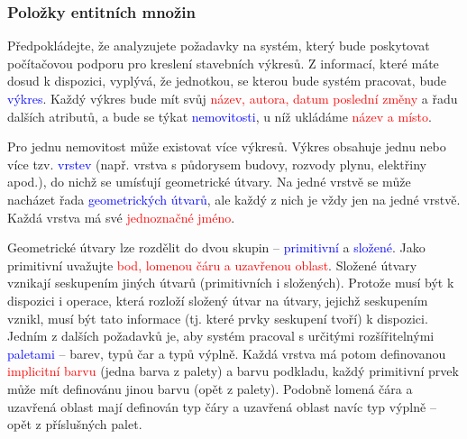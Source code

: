 \documentclass{beamer}
\begin{document}
  \begin{frame}
    \frametitle{Položky entitních množin}
    \scriptsize{
    \hspace{0.5cm}Předpokládejte, že analyzujete požadavky na systém, který bude poskytovat počítačovou
    podporu pro kreslení stavebních výkresů. Z informací, které máte dosud k dispozici,
    vyplývá, že jednotkou, se kterou bude systém pracovat, bude \textcolor{blue}{výkres}. Každý výkres bude
    mít svůj \textcolor{red}{název, autora, datum poslední změny} a řadu dalších atributů, a bude se týkat
    \textcolor{blue}{nemovitosti}, u níž ukládáme \textcolor{red}{název a místo}.\par


    \hspace{0.5cm}Pro jednu nemovitost může existovat více výkresů. Výkres obsahuje jednu nebo více tzv.
    \textcolor{blue}{vrstev} (např. vrstva s půdorysem budovy, rozvody plynu, elektřiny apod.), do nichž se
    umísťují geometrické útvary. Na jedné vrstvě se může nacházet řada \textcolor{blue}{geometrických útvarů},
    ale každý z nich je vždy jen na jedné vrstvě. Každá vrstva má své \textcolor{red}{jednoznačné jméno}.\par


    \hspace{0.5cm}Geometrické útvary lze rozdělit do dvou skupin -- \textcolor{blue}{primitivní} a \textcolor{blue}{složené}. Jako primitivní
    uvažujte \textcolor{red}{bod, lomenou čáru a uzavřenou oblast}. Složené útvary vznikají seskupením jiných
    útvarů (primitivních i složených). Protože musí být k dispozici i operace, která rozloží
    složený útvar na útvary, jejichž seskupením vznikl, musí být tato informace (tj. které
    prvky seskupení tvoří) k dispozici. Jedním z dalších požadavků je, aby systém pracoval
    s určitými rozšířitelnými \textcolor{blue}{paletami} -- barev, typů čar a typů výplně. Každá vrstva má
    potom definovanou \textcolor{red}{implicitní barvu} (jedna barva  z  palety) a barvu podkladu, každý
    primitivní prvek může mít definovánu jinou barvu (opět z palety). Podobně lomená čára
    a uzavřená oblast mají definován typ čáry a uzavřená oblast navíc typ výplně – opět
    z příslušných palet.\par}
  \end{frame}
\end{document}
